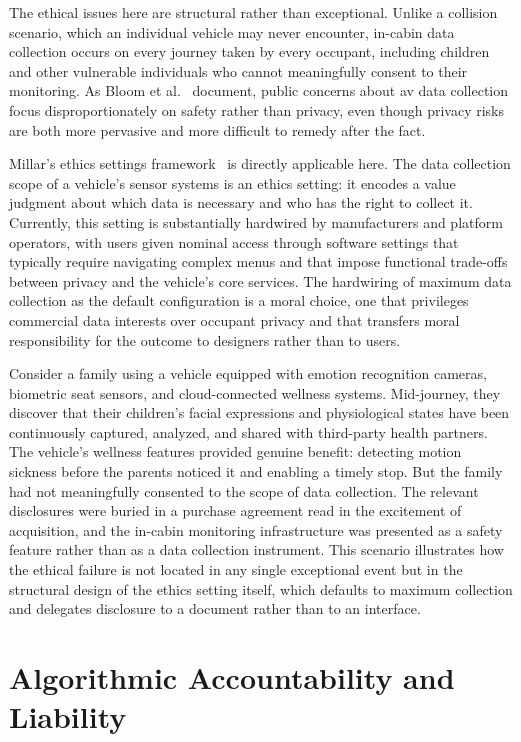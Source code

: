\documentclass{ieee-portfolio}
\begin{document}
The ethical issues here are structural rather than exceptional. Unlike a collision scenario, which an individual vehicle may never encounter, in-cabin data collection occurs on every journey taken by every occupant, including children and other vulnerable individuals who cannot meaningfully consent to their monitoring. As Bloom et al.~\cite{bloom_selfdriving_2017} document, public concerns about \gls{av} data collection focus disproportionately on safety rather than privacy, even though privacy risks are both more pervasive and more difficult to remedy after the fact.
 
Millar's ethics settings framework~\cite{millar_ethics_2017} is directly applicable here. The data collection scope of a vehicle's sensor systems is an ethics setting: it encodes a value judgment about which data is necessary and who has the right to collect it. Currently, this setting is substantially hardwired by manufacturers and platform operators, with users given nominal access through software settings that typically require navigating complex menus and that impose functional trade-offs between privacy and the vehicle's core services. The hardwiring of maximum data collection as the default configuration is a moral choice, one that privileges commercial data interests over occupant privacy and that transfers moral responsibility for the outcome to designers rather than to users.
 
Consider a family using a vehicle equipped with emotion recognition cameras, biometric seat sensors, and cloud-connected wellness systems. Mid-journey, they discover that their children's facial expressions and physiological states have been continuously captured, analyzed, and shared with third-party health partners. The vehicle's wellness features provided genuine benefit: detecting motion sickness before the parents noticed it and enabling a timely stop. But the family had not meaningfully consented to the scope of data collection. The relevant disclosures were buried in a purchase agreement read in the excitement of acquisition, and the in-cabin monitoring infrastructure was presented as a safety feature rather than as a data collection instrument. This scenario illustrates how the ethical failure is not located in any single exceptional event but in the structural design of the ethics setting itself, which defaults to maximum collection and delegates disclosure to a document rather than to an interface.
 
\section{Algorithmic Accountability and Liability}
 
\end{document}
